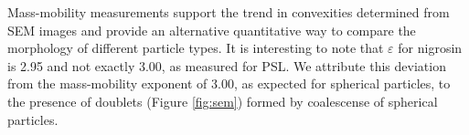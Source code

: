 Mass-mobility measurements support the trend in convexities determined from SEM images and provide an alternative quantitative way to compare the morphology of different particle types. It is interesting to note that $\varepsilon$ for nigrosin is 2.95 and not exactly 3.00, as measured for PSL. We attribute this deviation from the mass-mobility exponent of 3.00, as expected for spherical particles, to the presence of doublets (Figure \ref{fig:sem}) formed by coalescense of spherical particles.
